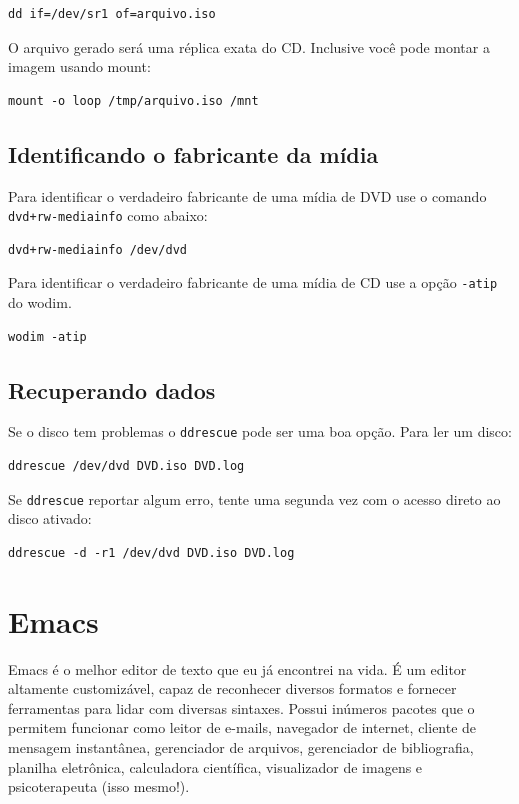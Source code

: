 \documentclass[12pt,brazil]{book}
\begin{document}
\begin{verbatim}
dd if=/dev/sr1 of=arquivo.iso
\end{verbatim}

O arquivo gerado será uma réplica exata do CD. Inclusive você pode
montar a imagem usando mount:

\begin{verbatim}
mount -o loop /tmp/arquivo.iso /mnt
\end{verbatim}

\section{Identificando o fabricante da mídia}
\label{sec:ident-o-fabr}

Para identificar o verdadeiro fabricante de uma mídia de DVD use o
comando \texttt{dvd+rw-mediainfo} como abaixo:

\begin{verbatim}
dvd+rw-mediainfo /dev/dvd
\end{verbatim}

Para identificar o verdadeiro fabricante de uma mídia de CD use a
opção \texttt{-atip} do wodim.

\begin{verbatim}
wodim -atip 
\end{verbatim}

\section{Recuperando dados}
\label{sec:recuperando-dados}

Se o disco tem problemas o \texttt{ddrescue} pode ser uma boa opção.
Para ler um disco:

\begin{verbatim}
ddrescue /dev/dvd DVD.iso DVD.log
\end{verbatim}

Se \texttt{ddrescue} reportar algum erro, tente uma segunda vez com o
acesso direto ao disco ativado:

\begin{verbatim}
ddrescue -d -r1 /dev/dvd DVD.iso DVD.log
\end{verbatim}

\chapter{Emacs}
\label{cha:emacs}

Emacs é o melhor editor de texto que eu já encontrei na vida. É um
editor altamente customizável, capaz de reconhecer diversos formatos e
fornecer ferramentas para lidar com diversas sintaxes. Possui inúmeros
pacotes que o permitem funcionar como leitor de e-mails, navegador de
internet, cliente de mensagem instantânea, gerenciador de arquivos,
gerenciador de bibliografia, planilha eletrônica, calculadora
científica, visualizador de imagens e psicoterapeuta (isso mesmo!).
\end{document}
